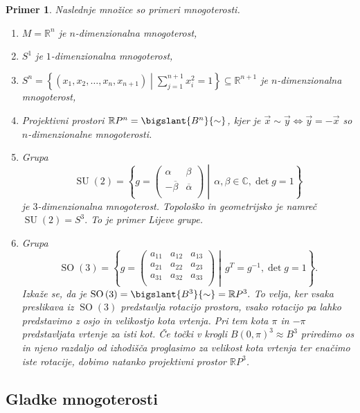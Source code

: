 \documentclass[10pt, a4paper]{article}
\newtheorem{primer}[izr]{Primer}
\begin{document}
\begin{primer} Naslednje množice so primeri mnogoterosti.

\begin{enumerate} \item $M = \mathbb{R}^n$ je
$n$-dimenzionalna mnogoterost, \item $S^1$ je
$1$-dimenzionalna mnogoterost, \item $S^{n} =
\left\{\left( x_1, x_2, \ldots, x_n, x_{n+1}
\right) \middle| \sum_{j=1}^{n+1} x_{i}^2 =
1\right\} \subseteq \mathbb{R}^{n+1}$ je
$n$-dimenzionalna mnogoterost, \item Projektivni
prostori $\mathbb{R}P^{n} = \bigslant{B^{n}}{\sim} $,
kjer je $\vec{x} \sim \vec{y}  \iff \vec{y}  =
-\vec{x}$ so $n$-dimenzionalne mnogoterosti. \item
Grupa \[ \operatorname{SU}\left( 2 \right) = \left\{ g
= \begin{pmatrix} \alpha & \beta \\ -
\overline{\beta}  & \overline{\alpha}  \\
\end{pmatrix}  \middle|\, \alpha, \beta \in  \mathbb{C}, \det
g = 1 \right\} 	\]je $3$-dimenzionalna mnogoterost. Topološko in
geometrijsko je namreč $\operatorname{SU}\left( 2 \right) = S^3.$ To
je primer Lijeve grupe. \item Grupa \[
\operatorname{SO}\left( 3 \right) =
\left\{ g = \begin{pmatrix} a_{11} &
a_{12} & a_{13} \\ a_{21} & a_{22}
& a_{23} \\ a_{31} & a_{32}
& a_{33} \\ \end{pmatrix}
\middle|\, g^{T} = g^{-1}, \det  g
= 1 \right\}. \] Izkaže se, da je
$\operatorname{SO}\left( 3\right ) =
\bigslant{B^3}{\sim } = \mathbb{R}P^3.$ To
velja, ker vsaka preslikava iz
$\operatorname{SO}\left( 3\right )$
predstavlja rotacijo prostora, vsako
rotacijo pa lahko predstavimo z osjo in
velikostjo kota vrtenja. Pri tem kota $\pi$
in $-\pi$ predstavljata vrtenje za isti
kot. Če točki v krogli $B\left( 0, \pi
\right)^{3} \approx B^3$ priredimo os in njeno
razdaljo od izhodišča proglasimo za velikost kota vrtenja
ter enačimo iste rotacije, dobimo natanko projektivni prostor
$\mathbb{R}P^3$.
\end{enumerate}
\end{primer}

\subsection{Gladke mnogoterosti}%
\end{document}
